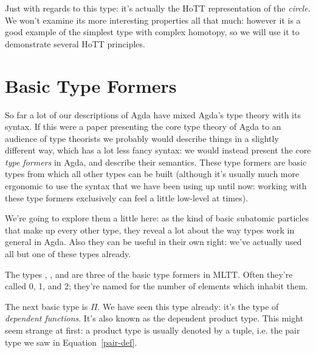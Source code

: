 Just with regards to this  type: it's actually the
HoTT representation of the \emph{circle}.
We won't examine its more interesting properties all that much: however it is a
good example of the simplest type with complex homotopy, so we will use it to
demonstrate several HoTT principles.
\section{Basic Type Formers}
So far a lot of our descriptions of Agda have mixed Agda's type theory with its
syntax.
If this were a paper presenting the core type theory of Agda to an audience of
type theorists we probably would describe things in a slightly different way,
which has a lot less fancy syntax: we would instead present the core \emph{type
  formers} in Agda, and describe their semantics.
These type formers are basic types from which all other types can be built
(although it's usually much more ergonomic to use the syntax that we have been
using up until now: working with these type formers exclusively can feel a
little low-level at times).

We're going to explore them a little here: as the kind of basic subatomic
particles that make up every other type, they reveal a lot about the way types
work in general in Agda.
Also they can be useful in their own right: we've actually used all but one of
these types already.

The types \agdabot, \agdatop, and  are three of the basic
type formers in MLTT.
Often they're called 0, 1, and 2; they're named for the number of elements which
inhabit them.

The next basic type is \(\Pi\).
We have seen this type already: it's the type of \emph{dependent functions}.
It's also known as the dependent product type.
This might seem strange at first: a product type is usually denoted by a tuple,
i.e. the pair type we saw in Equation~\ref{pair-def}.



